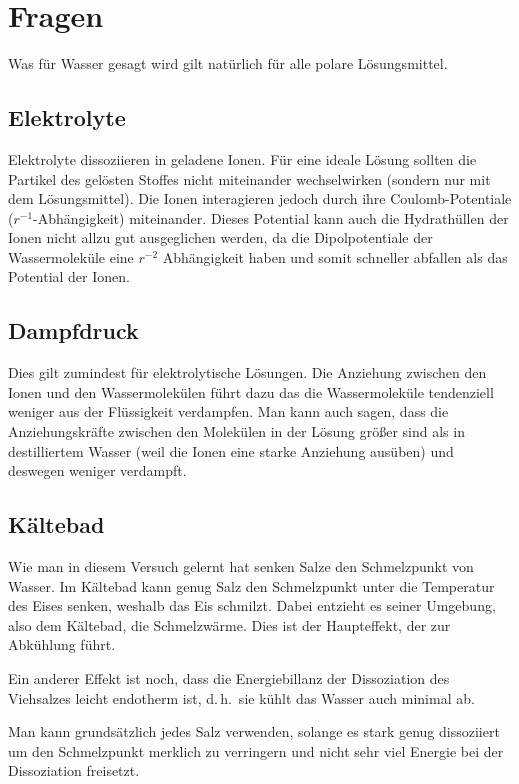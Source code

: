 \section{Fragen}
Was für Wasser gesagt wird gilt natürlich für alle polare Lösungsmittel.

\subsection{Elektrolyte}
Elektrolyte dissoziieren in geladene Ionen. Für eine ideale Lösung sollten die Partikel des gelösten Stoffes nicht miteinander wechselwirken (sondern nur mit dem Lösungsmittel). Die Ionen interagieren jedoch durch ihre Coulomb-Potentiale ($r^{-1}$-Abhängigkeit) miteinander. Dieses Potential kann auch die Hydrathüllen der Ionen nicht allzu gut ausgeglichen werden, da die Dipolpotentiale der Wassermoleküle eine $r^{-2}$ Abhängigkeit haben und somit schneller abfallen als das Potential der Ionen.

\subsection{Dampfdruck}
Dies gilt zumindest für elektrolytische Lösungen. Die Anziehung zwischen den Ionen und den Wassermolekülen führt dazu das die Wassermoleküle tendenziell weniger aus der Flüssigkeit verdampfen. Man kann auch sagen, dass die Anziehungskräfte zwischen den Molekülen in der Lösung größer sind als in destilliertem Wasser (weil die Ionen eine starke Anziehung ausüben) und deswegen weniger verdampft.

\subsection{Kältebad}
Wie man in diesem Versuch gelernt hat senken Salze den Schmelzpunkt von Wasser. Im Kältebad kann genug Salz den Schmelzpunkt unter die Temperatur des Eises senken, weshalb das Eis schmilzt. Dabei entzieht es seiner Umgebung, also dem Kältebad, die Schmelzwärme. Dies ist der Haupteffekt, der zur Abkühlung führt.

Ein anderer Effekt ist noch, dass die Energiebillanz der Dissoziation des Viehsalzes leicht endotherm ist, d.\,h.\ sie kühlt das Wasser auch minimal ab.

Man kann grundsätzlich jedes Salz verwenden, solange es stark genug dissoziiert um den Schmelzpunkt merklich zu verringern und nicht sehr viel Energie bei der Dissoziation freisetzt.



